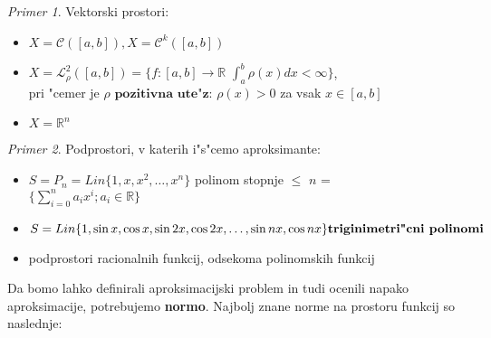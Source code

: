 \documentclass[a4paper,12pt]{article}
\theoremstyle{definition}
\theoremstyle{remark}
\newtheorem*{ex}{Primer}
\newcommand{\R}{\mathbb{R}}
\begin{document}
\begin{ex}
    Vektorski prostori:
    \begin{itemize}
        \item $X = \mathscr{C}([a, b]), X = \mathscr{C}^k([a, b])$
        \item $X = \mathscr{L}^{2}_{\rho}([a, b]) = \{f\colon[a, b] \to \R$ $\int_{a}^{b} \rho (x) dx < \infty \}$,\\
        pri "cemer je $\rho \textbf{ pozitivna ute"z: } \rho (x) > 0$ za vsak $x \in [a, b]$
        \item $X = \R ^n$
    \end{itemize}
\end{ex}

\begin{ex}
    Podprostori, v katerih i"s"cemo aproksimante:
    
    \begin{itemize}
        \item $S = P_n = Lin\{1, x, x^2, \dots, x^n\}$ polinom stopnje $\leq$ $n$ = \\
        $\{ \sum_{i = 0}^{n} a_i x^i; a_i \in \R \}$
        \item $S = Lin\{1, \sin x, \cos x, \sin 2x, \cos 2x, \dots, \sin nx, \cos nx\} \\
        \textbf{triginimetri"cni polinomi}$
        \item podprostori racionalnih funkcij, odsekoma polinomskih funkcij
    \end{itemize}
\end{ex}

Da bomo lahko definirali aproksimacijski problem in tudi ocenili napako aproksimacije, potrebujemo \textbf{normo}. Najbolj znane norme na prostoru funkcij so naslednje:
\end{document}
